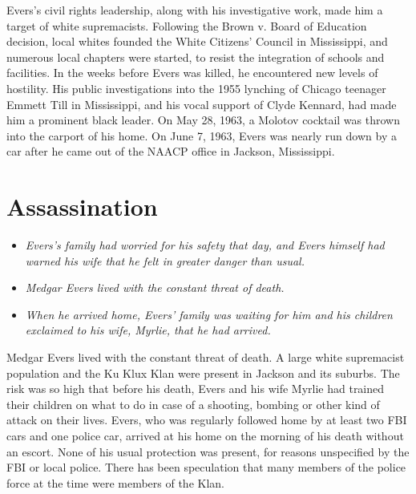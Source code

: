 Evers's civil rights leadership, along with his investigative work, made
him a target of white supremacists. Following the Brown v. Board of
Education decision, local whites founded the White Citizens' Council in
Mississippi, and numerous local chapters were started, to resist the
integration of schools and facilities. In the weeks before Evers was
killed, he encountered new levels of hostility. His public
investigations into the 1955 lynching of Chicago teenager Emmett Till in
Mississippi, and his vocal support of Clyde Kennard, had made him a
prominent black leader. On May 28, 1963, a Molotov cocktail was thrown
into the carport of his home. On June 7, 1963, Evers was nearly run down
by a car after he came out of the NAACP office in Jackson, Mississippi.

\section{Assassination}\label{assassination}

\begin{itemize}
\item
  \emph{Evers's family had worried for his safety that day, and Evers
  himself had warned his wife that he felt in greater danger than
  usual.}
\item
  \emph{Medgar Evers lived with the constant threat of death.}
\item
  \emph{When he arrived home, Evers' family was waiting for him and his
  children exclaimed to his wife, Myrlie, that he had arrived.}
\end{itemize}

Medgar Evers lived with the constant threat of death. A large white
supremacist population and the Ku Klux Klan were present in Jackson and
its suburbs. The risk was so high that before his death, Evers and his
wife Myrlie had trained their children on what to do in case of a
shooting, bombing or other kind of attack on their lives. Evers, who was
regularly followed home by at least two FBI cars and one police car,
arrived at his home on the morning of his death without an escort. None
of his usual protection was present, for reasons unspecified by the FBI
or local police. There has been speculation that many members of the
police force at the time were members of the Klan.

